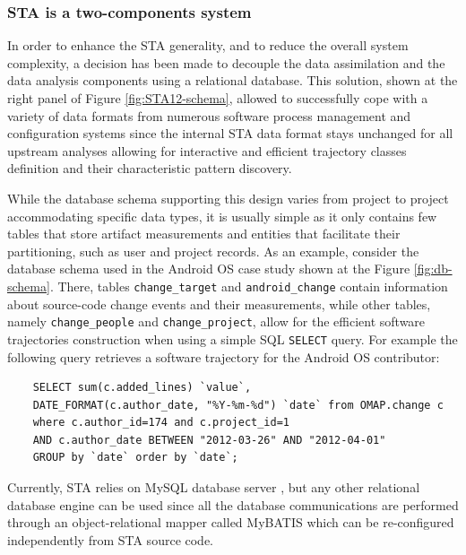\subsubsection{STA is a two-components system}\label{two_components}
In order to enhance the STA generality, and to reduce the overall system complexity, a decision has been made to decouple the data assimilation and the data analysis components using a relational database. This solution, shown at the right panel of Figure \ref{fig:STA12-schema}, allowed to successfully cope with a variety of data formats from numerous software process management and configuration systems since the internal STA data format stays unchanged for all upstream analyses allowing for interactive and efficient trajectory classes definition and their characteristic pattern discovery. 

While the database schema supporting this design varies from project to project accommodating specific data types, it is usually simple as it only contains few tables that store artifact measurements and entities that facilitate their partitioning, such as user and project records. As an example, consider the database schema used in the Android OS case study shown at the Figure \ref{fig:db-schema}. There, tables \texttt{change\_target} and \texttt{android\_change} contain information about source-code change events and their measurements, while other tables, namely \texttt{change\_people} and \texttt{change\_project}, allow for the efficient software trajectories construction when using a simple SQL \texttt{SELECT} query. For example the following query retrieves a software trajectory for the Android OS contributor: 
\begin{verbatim}
    SELECT sum(c.added_lines) `value`, 
    DATE_FORMAT(c.author_date, "%Y-%m-%d") `date` from OMAP.change c
    where c.author_id=174 and c.project_id=1
    AND c.author_date BETWEEN "2012-03-26" AND "2012-04-01"
    GROUP by `date` order by `date`;
\end{verbatim}

Currently, STA relies on MySQL database server \cite{mysql}, but any other relational database engine can be used since all the database communications are performed through an object-relational mapper called MyBATIS \cite{mybatis} which can be re-configured independently from STA source code.

